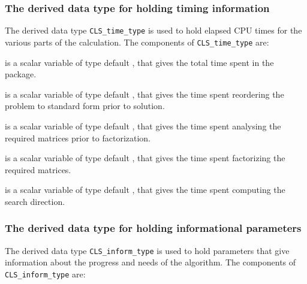 \documentclass{galahad}
\newcommand{\packagename}{CLS}
\begin{document}
\subsubsection{The derived data type for holding timing
 information}\label{typetime}
The derived data type
{\tt \packagename\_time\_type}
is used to hold elapsed CPU times for the various parts of the calculation.
The components of
{\tt \packagename\_time\_type}
are:
\begin{description}
 is a scalar variable of type default \real, that gives
 the total time spent in the package.

 is a scalar variable of type default \real, that gives
 the time spent reordering the problem to standard form prior to solution.

 is a scalar variable of type default \real, that gives
 the time spent analysing the required matrices prior to factorization.

 is a scalar variable of type default \real, that gives
 the time spent factorizing the required matrices.

 is a scalar variable of type default \real, that gives
 the time spent computing the search direction.

\end{description}


\subsubsection{The derived data type for holding informational
 parameters}\label{typeinform}
The derived data type
{\tt \packagename\_inform\_type}
is used to hold parameters that give information about the progress and needs
of the algorithm. The components of
{\tt \packagename\_inform\_type}
are:
\end{document}
